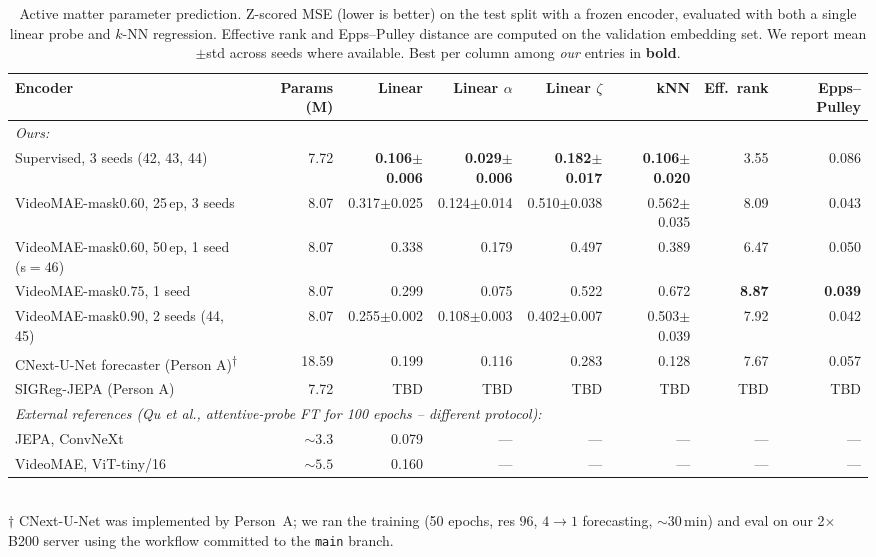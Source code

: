 \documentclass{article}
\begin{document}
\begin{table}[t]
\centering
\caption{Active matter parameter prediction. Z-scored MSE (lower is better) on
the test split with a frozen encoder, evaluated with both a single linear probe
and $k$-NN regression. Effective rank and Epps--Pulley distance are computed on
the validation embedding set. We report mean$\pm$std across seeds where
available. Best per column among \emph{our} entries in \textbf{bold}.}
\label{tab:main-results}
\small
\begin{tabular}{lrrrrrrr}
\toprule
\textbf{Encoder} & \textbf{Params (M)} & \textbf{Linear} & \textbf{Linear $\alpha$} & \textbf{Linear $\zeta$} & \textbf{kNN} & \textbf{Eff.\ rank} & \textbf{Epps--Pulley} \\
\midrule
\textit{Ours:} & & & & & & & \\
\quad Supervised, 3 seeds (42, 43, 44)                & 7.72 & \textbf{0.106$\pm$0.006} & \textbf{0.029$\pm$0.006} & \textbf{0.182$\pm$0.017} & \textbf{0.106$\pm$0.020} & 3.55 & 0.086 \\
\quad VideoMAE-mask$0.60$, 25\,ep, 3 seeds              & 8.07 & 0.317$\pm$0.025 & 0.124$\pm$0.014 & 0.510$\pm$0.038 & 0.562$\pm$0.035 & 8.09 & 0.043 \\
\quad VideoMAE-mask$0.60$, 50\,ep, 1 seed (s$=46$)      & 8.07 & 0.338 & 0.179 & 0.497 & 0.389 & 6.47 & 0.050 \\
\quad VideoMAE-mask$0.75$, 1 seed                       & 8.07 & 0.299 & 0.075 & 0.522 & 0.672 & \textbf{8.87} & \textbf{0.039} \\
\quad VideoMAE-mask$0.90$, 2 seeds (44, 45)             & 8.07 & 0.255$\pm$0.002 & 0.108$\pm$0.003 & 0.402$\pm$0.007 & 0.503$\pm$0.039 & 7.92 & 0.042 \\
\quad CNext-U-Net forecaster (Person A)\textsuperscript{$\dagger$}  & 18.59 & 0.199 & 0.116 & 0.283 & 0.128 & 7.67 & 0.057 \\
\quad SIGReg-JEPA (Person A)                            & 7.72 & TBD   & TBD   & TBD   & TBD   & TBD            & TBD            \\
\midrule
\multicolumn{8}{l}{\emph{External references (Qu et al., attentive-probe FT for 100 epochs -- different protocol):}} \\
\quad JEPA, ConvNeXt                        & ${\sim}3.3$ & 0.079 & --- & --- & --- & --- & --- \\
\quad VideoMAE, ViT-tiny/16                 & ${\sim}5.5$ & 0.160 & --- & --- & --- & --- & --- \\
\bottomrule
\end{tabular}\\[3pt]
{\footnotesize $\dagger$ CNext-U-Net was implemented by Person~A; we ran the
training (50 epochs, res $96$, $4{\to}1$ forecasting, $\sim$$30$\,min) and
eval on our 2$\times$ B200 server using the workflow committed to the
\texttt{main} branch.}
\end{table}
\end{document}
